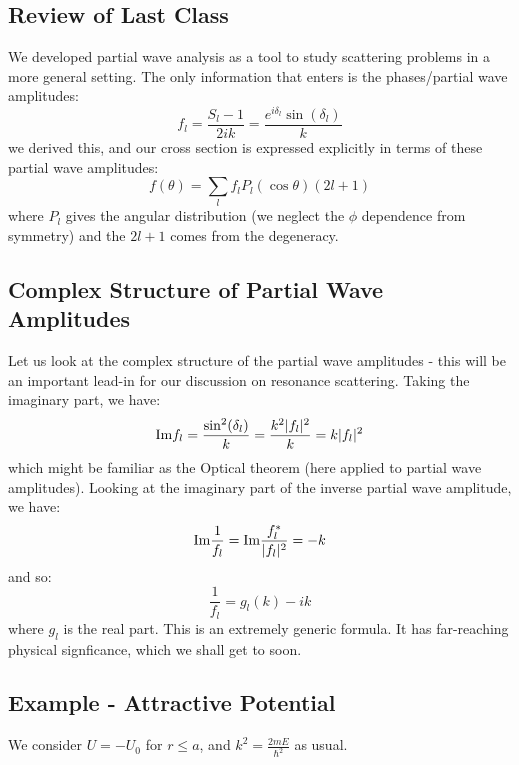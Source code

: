 \section{}
\subsection{Review of Last Class}
We developed partial wave analysis as a tool to study scattering problems in a more general setting. The only information that enters is the phases/partial wave amplitudes:
\begin{equation}
    f_l = \frac{S_l - 1}{2ik} = \frac{e^{i\delta_l}\sin(\delta_l)}{k}
\end{equation}
we derived this, and our cross section is expressed explicitly in terms of these partial wave amplitudes:
\begin{equation}
    f(\theta) = \sum_l f_l P_l(\cos\theta)(2l+1)
\end{equation}
where $P_l$ gives the angular distribution (we neglect the $\phi$ dependence from symmetry) and the $2l+1$ comes from the degeneracy.

\subsection{Complex Structure of Partial Wave Amplitudes}
Let us look at the complex structure of the partial wave amplitudes - this will be an important lead-in for our discussion on resonance scattering. Taking the imaginary part, we have:
\begin{equation}
    \text{Im}f_l = \frac{\sin^2(\delta_l)}{k} = \frac{k^2\lvert f_l \rvert^2}{k} = k\lvert f_l \rvert^2
\end{equation}
which might be familiar as the Optical theorem (here applied to partial wave amplitudes). Looking at the imaginary part of the inverse partial wave amplitude, we have:
\begin{equation}
    \text{Im}\frac{1}{f_l} = \text{Im}\frac{f_l^*}{\lvert f_l \rvert^2} = -k
\end{equation}
and so:
\begin{equation}\label{eq-fl}
    \frac{1}{f_l} = g_l(k) - ik
\end{equation}
where $g_l$ is the real part. This is an extremely generic formula. It has far-reaching physical signficance, which we shall get to soon.

\subsection{Example - Attractive Potential}
We consider $U = -U_0$ for $r \leq a$, and $k^2 = \frac{2mE}{\hbar^2}$ as usual.

